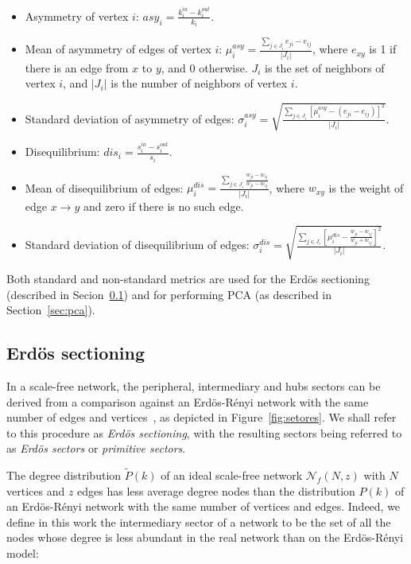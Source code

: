 \documentclass[%
	aip,
	jmp,%
	amsmath,amssymb,
	reprint,%
]{revtex4-1}
\begin{document}
\begin{itemize}
	\item Asymmetry of vertex $i$: $asy_i=\frac{k_i^{in}-k_i^{out}}{k_i}$.
	\item Mean of asymmetry of edges of vertex $i$: $\mu_i^{asy}=\frac{\sum_{j\in J_i} e_{ji}-e_{ij}}{|J_i|}$, where $e_{xy}$ is 1 if there is an edge from $x$ to $y$, and $0$ otherwise. $J_i$ is the set of neighbors of vertex $i$, and $|J_i|$ is the number of neighbors of vertex $i$.
	\item Standard deviation of asymmetry of edges: $\sigma_i^{asy}=\sqrt{\frac{\sum_{j\in J_i}[\mu^{asy}_i -(e_{ji}-e_{ij}) ]^2  }{|J_i|}  }$.
	\item Disequilibrium: $dis_i=\frac{s_i^{in}-s_i^{out}}{s_i}$.
	\item Mean of disequilibrium of edges: $\mu_i^{dis}=\frac{\sum_{j \in J_i}\frac{w_{ji}-w_{ij}}{w_{ji}-w_{ij}}}{|J_i|}$, where $w_{xy}$ is the weight of edge $x\rightarrow y$ and zero if there is no such edge.
	\item Standard deviation of disequilibrium of edges: $\sigma_i^{dis}=\sqrt{\frac{\sum_{j\in J_i}\left[\mu^{dis}_i-\frac{w_{ji}-w_{ij}}{w_{ji}+w_{ij}}\right]^2}{|J_i|}}$.
\end{itemize}

Both standard and non-standard metrics are used for the Erd\"os sectioning (described in Secion~\ref{sectioning}) and for performing PCA (as described in Section~\ref{sec:pca}).


\subsection{Erd\"os sectioning}\label{sectioning}
In a scale-free network, the peripheral, intermediary and hubs sectors can be derived from a comparison against an Erd\"os-R\'enyi network with the same number of edges and vertices~\cite{3setores}, as depicted in Figure~\ref{fig:setores}. We shall refer to this procedure as \emph{Erd\"os sectioning}, with the resulting sectors being referred to as \emph{Erd\"os sectors} or \emph{primitive sectors}.

The degree distribution $\widetilde{P}(k)$ of an ideal
scale-free network $\mathcal{N}_f(N,z)$ with $N$ vertices and $z$ edges has less
average degree nodes than the distribution $P(k)$ of an Erd\"os-R\'enyi
network with the same number of vertices and edges. Indeed, we define in this work the intermediary sector of a network to be the set of all the nodes whose degree is less abundant in the real network than on the Erd\"os-R\'enyi model:
\end{document}
